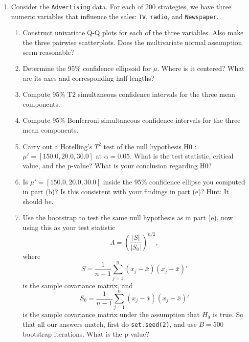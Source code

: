 \documentclass[12pt,a4paper]{paper}
\begin{document}
\begin{enumerate}
\begin{enumerate}
\end{enumerate}
\item Consider the \texttt{Advertising} data. For each of 200 strategies, we have three numeric variables that influence the sales: \texttt{TV}, \texttt{radio}, and \texttt{Newspaper}.
\begin{enumerate}
\item Construct univariate Q-Q plots for each of the three variables. Also make the three
pairwise scatterplots. Does the multivariate normal assumption seem reasonable?
\item Determine the 95\% confidence ellipsoid for $\mu$. Where is it centered? What are its axes and corresponding half-lengths?
\item Compute 95\% T2 simultaneous confidence intervals for the three mean components.
\item Compute 95\% Bonferroni simultaneous confidence intervals for the three mean components.
\item Carry out a Hotelling's $T^{2}$ test of the null hypothesis H0 : $\mu' = \left[150.0,20.0,30.0\right]$ at $\alpha = 0.05$. What is the test statistic, critical value, and the p-value? What is your conclusion regarding H0?
\item Is $\mu' = [150.0, 20.0, 30.0]$ inside the 95\% confidence ellipse you computed in part (b)? Is this consistent with your findings in part (e)? Hint: It should be.
\item Use the bootstrap to test the same null hypothesis as in part (e), now using this as your test statistic
\[\Lambda = \left(\frac{\left|S\right|}{\left|S_{0}\right|}\right)^{n/2},\]where \[S = \frac{1}{n-1}\sum_{j=1}^{n}(x_{j}-\bar{x})(x_{j}-\bar{x})'\] is the sample covariance matrix, and \[S_{0} = \frac{1}{n-1}\sum_{j=1}^{n}(x_{j}-\bar{x})(x_{j}-\bar{x})'\] is the sample covariance matrix under the assumption that $H_{0}$ is true. So that all our answers match, first do \texttt{set.seed(2)}, and use $B=500$ bootstrap iterations. What is the p-value?
\end{enumerate}
\end{enumerate}
\end{document}
